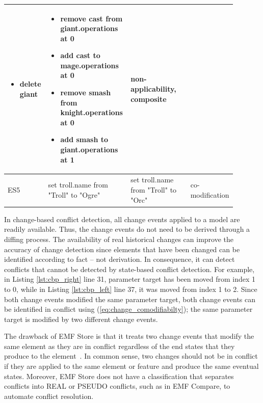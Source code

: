 \begin{table}[ht]
\begin{tabular}{|p{0.04\linewidth}|p{0.37\linewidth}|p{0.37\linewidth}|
		p{0.11\linewidth}|}
\begin{minipage}[t]{\linewidth}
\begin{itemize}[leftmargin=0pt]
			\item[] delete giant
		\end{itemize}
	\end{minipage}
	& 
	\begin{minipage}[t]{\linewidth}
		\raggedright
		\begin{itemize}[leftmargin=0pt]
			\setlength
			\item[] remove cast from giant.operations at 0
			\item[] add cast to mage.operations at 0
			\item[] remove smash from knight.operations at 0
			\item[] add smash to giant.operations at 1
		\end{itemize}
	\end{minipage}
	& 
	non-applicability, composite\\
	\hline
	ES5 & 
	set troll.name from "Troll" to "Ogre" & 
	set troll.name from "Troll" to "Orc" & 
	co-modification\\ 
	\hline
\end{tabular}
\end{table}

In change-based conflict detection, all change events applied to a model are readily available. Thus, the change events do not need to be derived through a diffing process. The availability of real historical changes can improve the accuracy of change detection since elements that have been changed can be identified according to fact -- not derivation. In consequence, it can detect conflicts that cannot be detected by state-based conflict detection. For example, in Listing \ref{lst:cbp_right} line 31, parameter \textsf{target} has been moved from index 1 to 0, while in Listing \ref{lst:cbp_left} line 37, it was moved from index 1 to 2. Since both change events modified the same parameter \textsf{target}, both change events can be identified in conflict using (\ref{eq:change_comodifiabilty}); the same parameter \textsf{target} is modified by two different change events. 

The drawback of EMF Store is that it treats two change events that modify the same element as they are in conflict regardless of the end states that they produce to the element~\cite{DBLP:conf/sfm/BroschKLSWW12}. In common sense, two changes should not be in conflict if they are applied to the same element or feature and produce the same eventual states. Moreover, EMF Store does not have a classification that separates conflicts into \textsf{REAL} or \textsf{PSEUDO} conflicts, such as in EMF Compare, to automate conflict resolution. 

